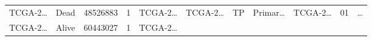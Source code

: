 \documentclass[
]{article}
\begin{document}
\begin{longtable}[]{@{}lllllllllll@{}}
\begin{minipage}[t]{0.07\columnwidth}
TCGA-2\ldots{}\strut
\end{minipage} & \begin{minipage}[t]{0.04\columnwidth}\raggedright
Dead\strut
\end{minipage} & \begin{minipage}[t]{0.06\columnwidth}\raggedright
48526883\strut
\end{minipage} & \begin{minipage}[t]{0.07\columnwidth}\raggedright
1\strut
\end{minipage} & \begin{minipage}[t]{0.07\columnwidth}\raggedright
TCGA-2\ldots{}\strut
\end{minipage} & \begin{minipage}[t]{0.07\columnwidth}\raggedright
TCGA-2\ldots{}\strut
\end{minipage} & \begin{minipage}[t]{0.07\columnwidth}\raggedright
TP\strut
\end{minipage} & \begin{minipage}[t]{0.07\columnwidth}\raggedright
Primar\ldots{}\strut
\end{minipage} & \begin{minipage}[t]{0.09\columnwidth}\raggedright
TCGA-2\ldots{}\strut
\end{minipage} & \begin{minipage}[t]{0.10\columnwidth}\raggedright
01\strut
\end{minipage} & \begin{minipage}[t]{0.03\columnwidth}\raggedright
\ldots{}\strut
\end{minipage}\tabularnewline
\begin{minipage}[t]{0.07\columnwidth}\raggedright
TCGA-2\ldots{}\strut
\end{minipage} & \begin{minipage}[t]{0.04\columnwidth}\raggedright
Alive\strut
\end{minipage} & \begin{minipage}[t]{0.06\columnwidth}\raggedright
60443027\strut
\end{minipage} & \begin{minipage}[t]{0.07\columnwidth}\raggedright
1\strut
\end{minipage} & \begin{minipage}[t]{0.07\columnwidth}\raggedright
TCGA-2\ldots{}\strut
\end{minipage} & \begin{minipage}[t]{0.07\columnwidth}\raggedright

\end{minipage}
\end{longtable}
\end{document}
